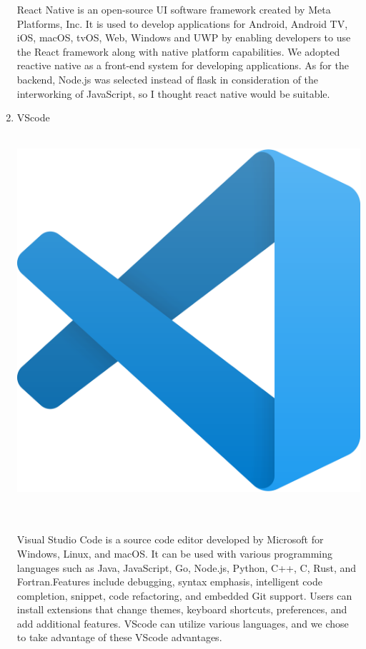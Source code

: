 \documentclass[conference]{IEEEtran}
\begin{document}
\begin{enumerate}
React Native is an open-source UI software framework created by Meta Platforms, Inc. It is used to develop applications for Android, Android TV, iOS, macOS, tvOS, Web, Windows and UWP by enabling developers to use the React framework along with native platform capabilities. We adopted reactive native as a front-end system for developing applications. As for the backend, Node.js was selected instead of flask in consideration of the interworking of JavaScript, so I thought react native would be suitable.\\
	\item{VScode}\\
	\\
	\centerline{\includegraphics[scale=0.05]{pics/VScode.png}}\\\\
Visual Studio Code is a source code editor developed by Microsoft for Windows, Linux, and macOS. It can be used with various programming languages such as Java, JavaScript, Go, Node.js, Python, C++, C, Rust, and Fortran.Features include debugging, syntax emphasis, intelligent code completion, snippet, code refactoring, and embedded Git support. Users can install extensions that change themes, keyboard shortcuts, preferences, and add additional features. VScode can utilize various languages, and we chose to take advantage of these VScode advantages.\\

\end{enumerate}
\end{document}
